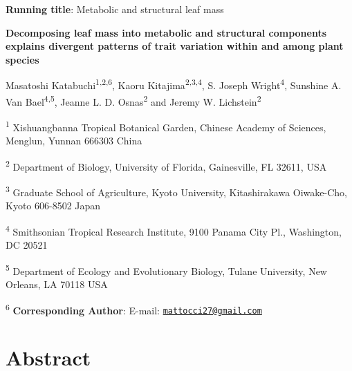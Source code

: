 \documentclass[
  12pt,
  a4paper,
,tablecaptionabove
]{scrartcl}
\date{}
\title{}
\author{}
\begin{document}




\textbf{Running title}: Metabolic and structural leaf mass

\textbf{Decomposing leaf mass into metabolic and structural components explains divergent patterns of trait variation within and among plant species}

Masatoshi Katabuchi\textsuperscript{1,2,6}, Kaoru Kitajima\textsuperscript{2,3,4}, S. Joseph Wright\textsuperscript{4}, Sunshine A. Van Bael\textsuperscript{4,5}, Jeanne L. D. Osnas\textsuperscript{2} and Jeremy W. Lichstein\textsuperscript{2}

\textsuperscript{1} Xishuangbanna Tropical Botanical Garden, Chinese Academy of Sciences, Menglun, Yunnan 666303 China

\textsuperscript{2} Department of Biology, University of Florida, Gainesville, FL 32611, USA

\textsuperscript{3} Graduate School of Agriculture, Kyoto University, Kitashirakawa Oiwake-Cho, Kyoto 606-8502 Japan

\textsuperscript{4} Smithsonian Tropical Research Institute, 9100 Panama City Pl., Washington, DC 20521

\textsuperscript{5} Department of Ecology and Evolutionary Biology, Tulane University, New Orleans, LA 70118 USA

\textsuperscript{6} \textbf{Corresponding Author}: E-mail: \href{mailto:mattocci27@gmail.com}{\nolinkurl{mattocci27@gmail.com}}

\newpage

\hypertarget{abstract}{%
\section{Abstract}\label{abstract}}
\end{document}
